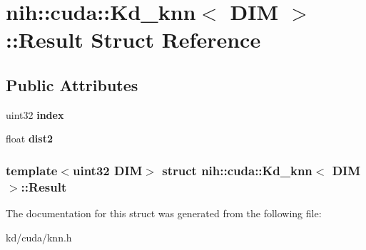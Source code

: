 \hypertarget{structnih_1_1cuda_1_1_kd__knn_1_1_result}{
\section{nih\-:\-:cuda\-:\-:\-Kd\-\_\-knn$<$ \-D\-I\-M $>$\-:\-:\-Result \-Struct \-Reference}
\label{structnih_1_1cuda_1_1_kd__knn_1_1_result}
}
\subsection*{\-Public \-Attributes}
\begin{DoxyCompactItemize}
\item 
\hypertarget{structnih_1_1cuda_1_1_kd__knn_1_1_result_aacbc39a1da748da6e3b3fe64cbee74be}{
uint32 {\bfseries index}}
\label{structnih_1_1cuda_1_1_kd__knn_1_1_result_aacbc39a1da748da6e3b3fe64cbee74be}

\item 
\hypertarget{structnih_1_1cuda_1_1_kd__knn_1_1_result_a40db37ae28a92d418dbc18100ccb8db5}{
float {\bfseries dist2}}
\label{structnih_1_1cuda_1_1_kd__knn_1_1_result_a40db37ae28a92d418dbc18100ccb8db5}

\end{DoxyCompactItemize}
\subsubsection*{template$<$uint32 \-D\-I\-M$>$ struct nih\-::cuda\-::\-Kd\-\_\-knn$<$ D\-I\-M $>$\-::\-Result}



\-The documentation for this struct was generated from the following file\-:\begin{DoxyCompactItemize}
\item 
kd/cuda/knn.\-h\end{DoxyCompactItemize}
